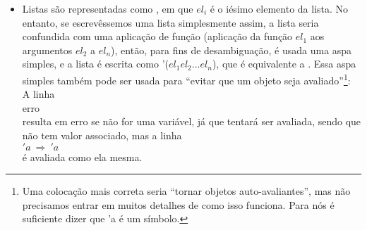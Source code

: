 \documentclass{article}
\begin{document}
\begin{itemize}
\item Listas são representadas como , em que $el_i$ é o iésimo elemento da lista. No entanto, se
  escrevêssemos uma lista simplesmente assim, a lista seria
  confundida com uma aplicação de função (aplicação da função $el_1$
  aos argumentos $el_2$ a $el_n$), então, para fins de
  desambiguação, é usada uma aspa simples, e a lista é escrita como
  '($el_1 el_2 ... el_n$), que é equivalente a  . Essa aspa simples também pode ser usada para
  ``evitar que um objeto seja avaliado''\footnote{Uma colocação mais
    correta seria ``tornar objetos auto-avaliantes'', mas não
    precisamos entrar em muitos detalhes de como isso funciona. Para
    nós é suficiente dizer que 'a é um símbolo.}:\\
  A linha\\
   \seta erro\\
  resulta em erro se  não for uma variável, já que
  tentará ser avaliada, sendo que  não tem valor
  associado, mas a linha\\
  $'a\ \Rightarrow\ 'a$\\
  é avaliada como ela mesma.\\


\end{itemize}
\end{document}
